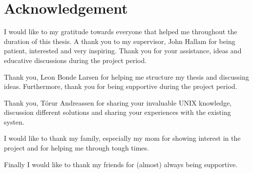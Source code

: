 {\let\clearpage\relax\chapter*{Acknowledgement}}

I would like to my gratitude towards everyone that helped me throughout the duration of this thesis. A thank you to my supervisor, John Hallam for being patient, interested and very inspiring. Thank you for your assistance, ideas and educative discussions during the project period. 

Thank you, Leon Bonde Larsen for helping me structure my thesis and discussing ideas. Furthermore, thank you for being supportive during the project period.

Thank you, Tórur Andreassen for sharing your invaluable UNIX knowledge, discussion different solutions and sharing your experiences with the existing systen.

I would like to thank my family, especially my mom for showing interest in the project and for helping me through tough times.

Finally I would like to thank my friends for (almost) always being supportive.


